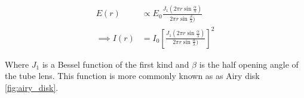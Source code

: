 \begin{align}
    E(r) &\propto E_0 \frac{J_1 \left(2\pi r \sin \frac{\alpha}{\lambda}\right)}{2\pi r \sin \frac{\beta}{\lambda})}\label{eq:E_airy}\\
    \implies
    I(r) &= I_0 \left[\frac{J_1 \left(2\pi r \sin \frac{\alpha}{\lambda}\right)}{2\pi r \sin \frac{\alpha}{\lambda})}\right]^2\label{eq:I_airy}
\end{align}

Where $J_1$ is a Bessel function of the first kind and $\beta$ is the half opening angle of the tube lens.
This function is more commonly known as as Airy disk \ref{fig:airy_disk}.


